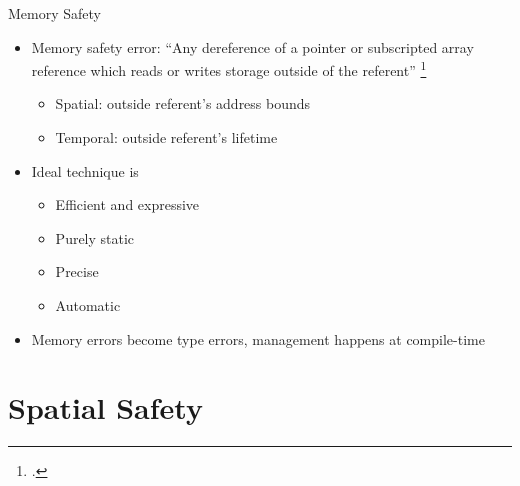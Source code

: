 \documentclass[aspectratio=169]{beamer}
\begin{document}
\begin{frame}{Memory Safety}
\begin{itemize}[<+->]
    \item Memory safety error: ``Any dereference of a pointer or subscripted array reference which reads or writes storage outside of the referent'' \footcite{austin_efficient_1994}
        \begin{itemize}
            \item Spatial: outside referent's \alert{address bounds}
            \item Temporal: outside referent's \alert{lifetime}
        \end{itemize}
    \item Ideal technique is
        \begin{itemize}
            \item Efficient and expressive %
            \item Purely static %
            \item Precise %
            \item Automatic %
        \end{itemize}
    \item Memory errors become \alert{type errors}, management happens at \alert{compile-time}
\end{itemize}
\end{frame}




\section{Spatial Safety}
\end{document}

